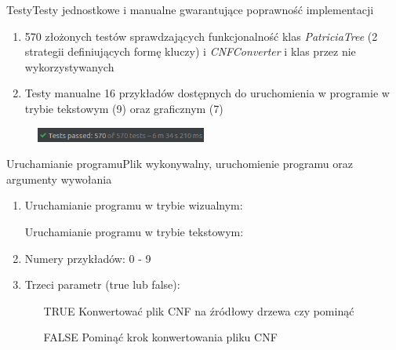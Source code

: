 \documentclass[aspectratio=1610,english]{beamer} %
\begin{document}
	\begin{frame}{Testy}{Testy jednostkowe i manualne gwarantujące poprawność implementacji}
	    \begin{enumerate}
	        \item {\color{AGH@green}570 złożonych testów} sprawdzających funkcjonalność klas \emph{PatriciaTree} (2 strategii definiujących formę kluczy) i \emph{CNFConverter} i klas przez nie wykorzystywanych
	        \item {\color{AGH@green}Testy manualne 16 przykładów} dostępnych do uruchomienia w programie w trybie tekstowym (9) oraz graficznym (7)
	    \end{enumerate}
        \begin{figure}[H]
	        \fontsize{3}{5} \selectfont
	        \hspace*{-0.9cm}\includegraphics[width=0.5\textwidth]{tests.png}
	    \end{figure}
    \end{frame}
	\begin{frame}{Uruchamianie programu}{Plik wykonywalny, uruchomienie programu oraz argumenty wywołania}
	    \begin{enumerate}
	        \item Uruchamianie programu w trybie wizualnym: \newline
    	       \usebox\runVisual \newline
    	       
	        Uruchamianie programu w trybie tekstowym: \newline
    	       \usebox\runText \newline
	        \item Numery przykładów: 0 - 9
	        \item Trzeci parametr (true lub false): 
	        \begin{enumerate}
	            \item [TRUE] Konwertować plik CNF na źródłowy drzewa czy pominąć
	            \item [FALSE] Pominąć krok konwertowania pliku CNF
	        \end{enumerate}
	    \end{enumerate}
    \end{frame}
\end{document}
